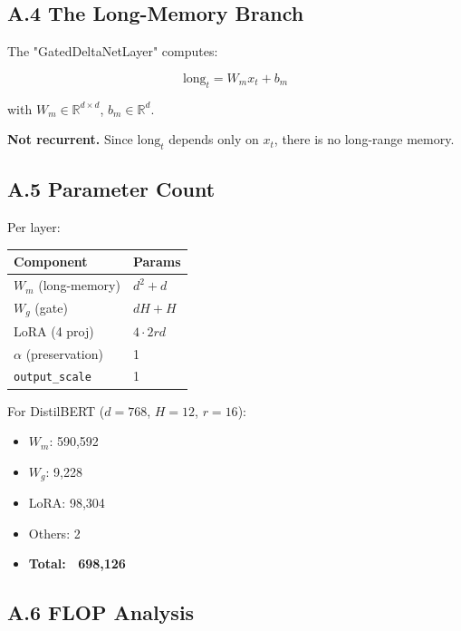 \subsection{A.4 The Long-Memory Branch}

The "GatedDeltaNetLayer" computes:

\[
\text{long}_t = W_m x_t + b_m
\tag{A.4}
\]

with $W_m \in \mathbb{R}^{d \times d}$, $b_m \in \mathbb{R}^d$.

\textbf{Not recurrent.} Since $\text{long}_t$ depends only on $x_t$, there is no 
long-range memory.

\subsection{A.5 Parameter Count}

Per layer:

\begin{table}[H]
\centering
\small
\begin{tabular}{ll}
\toprule
\textbf{Component} & \textbf{Params} \\
\midrule
$W_m$ (long-memory) & $d^2 + d$ \\
$W_g$ (gate) & $d H + H$ \\
LoRA (4 proj) & $4 \cdot 2 r d$ \\
$\alpha$ (preservation) & 1 \\
\texttt{output\_scale} & 1 \\
\bottomrule
\end{tabular}
\end{table}

For DistilBERT ($d = 768$, $H = 12$, $r = 16$):
\begin{itemize}
\item $W_m$: 590,592
\item $W_g$: 9,228
\item LoRA: 98,304
\item Others: 2
\item \textbf{Total: ~698,126}

\end{itemize}
\subsection{A.6 FLOP Analysis}

